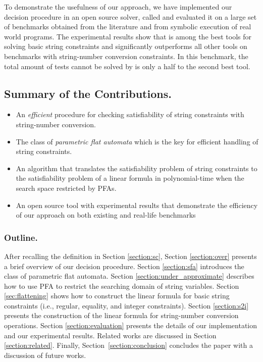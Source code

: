 \documentclass[sigplan,screen]{acmart}
\begin{document}
To demonstrate the usefulness of our approach, we have implemented our decision procedure in an open source solver, called {\tool} and evaluated it on a large set of benchmarks obtained from the literature and from symbolic execution of real world programs. The experimental results show that {\tool} is among the best tools for solving basic string constraints and significantly outperforms all other tools on benchmarks with string-number conversion constraints. In this benchmark, the total amount of tests cannot be solved by {\tool} is only a half to the second best tool.



\subsection*{Summary of the Contributions.}

\begin{itemize}

\item An {\em efficient} procedure for checking satisfiability
of string constraints with string-number conversion.



\item The class of \emph{parametric flat automata} which is the key for efficient handling of string constraints.

\item An algorithm that translates the satisfiability problem of string constraints to the satisfiability problem of a linear formula  in polynomial-time when  the search space restricted by PFAs.


\item An open source tool {\tool} with experimental
results that demonstrate the efficiency of
our approach on both existing and real-life benchmarks
\end{itemize}


\subsubsection*{Outline.}
After recalling the  definition in Section \ref{section:sc}, Section \ref{section:over} presents a brief overview of our decision procedure. 
Section \ref{section:sfa} introduces  the class of parametric flat automata. 
Section \ref{section:under_approximate} describes how to use PFA to restrict the searching domain of string variables.
Section \ref{sec:flattening} shows how to construct the linear formula for  basic string constraints (i.e., 
regular, equality, and integer constraints). 
 Section \ref{section:s2i} presents the construction of the linear formula for string-number conversion operations. Section \ref{section:evaluation} presents the details of our implementation and our experimental results.
 Related works are discussed in Section \ref{section:related}. Finally, Section~\ref{section:conclusion} concludes the paper with a discussion of future works.
\end{document}

